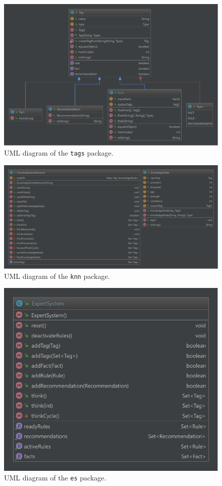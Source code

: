 \documentclass[titlepage,11pt]{article}
\newcommand{\code}[1]{\texttt{#1}}
\begin{document}
\begin{figure}[!htb]
	\centering
	\includegraphics[width=\columnwidth]{figures/uml_tags.pdf}
	\caption{UML diagram of the \code{tags} package.}
	\label{uml_tags}
\end{figure}

\begin{figure}[!htb]
	\centering
	\includegraphics[width=\columnwidth]{figures/uml_knn.pdf}
	\caption{UML diagram of the \code{knn} package.}
	\label{uml_knn}
\end{figure}

\begin{figure}[!htb]
	\centering
	\includegraphics[width=0.5\columnwidth]{figures/uml_es.pdf}
	\caption{UML diagram of the \code{es} package.}
	\label{uml_es}
\end{figure}
\end{document}
